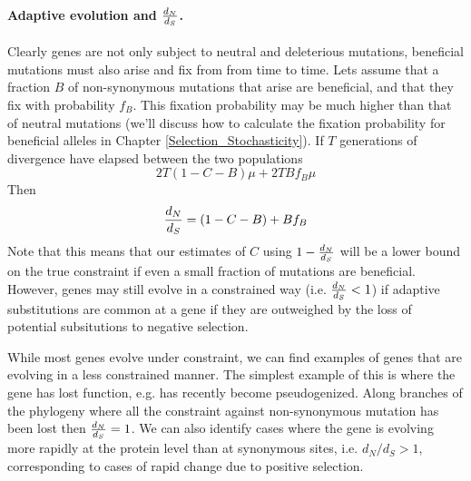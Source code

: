 \paragraph{Adaptive evolution and $\frac{d_N}{d_S}$.}
Clearly genes are not only subject to neutral and deleterious
mutations, beneficial mutations must also arise and fix from from time to time. 
Lets assume that a fraction $B$ of non-synonymous mutations that arise are
beneficial, and that they fix with probability $f_B$. This fixation
probability may be much higher than that of neutral mutations (we'll
discuss how to calculate the fixation probability for beneficial
alleles in Chapter \ref{Selection_Stochasticity}).  If $T$ generations of divergence have
elapsed between the two populations 
\begin{equation}
2T (1-C - B) \mu  + 2T B f_B \mu
\end{equation}
Then
\begin{equation} 
\frac{d_N}{d_S} = (1-C-B) +  B f_B
\end{equation}
Note that this means that our estimates of $C$ using $1-\frac{d_N}{d_S}$ will be
a  lower bound on the true constraint if even a small fraction of
mutations are beneficial.
However, genes may still evolve in a constrained way
(i.e. $\frac{d_N}{d_S}<1$)  if adaptive substitutions are common at a gene if
they are outweighed by the loss of potential subsitutions to negative selection.

While most genes evolve under constraint, we can find examples of
genes that are evolving in a less constrained manner. The simplest
example of this is where the gene has lost function, e.g. has recently
become pseudogenized. Along branches of the phylogeny where all the
constraint against non-synonymous mutation has
been lost then $\frac{d_N}{d_S}=1$. We can also identify cases where the gene
is evolving more rapidly at the protein level than at synonymous
sites, i.e. $d_N/d_S > 1$, corresponding to cases of rapid change due
to positive selection. 

